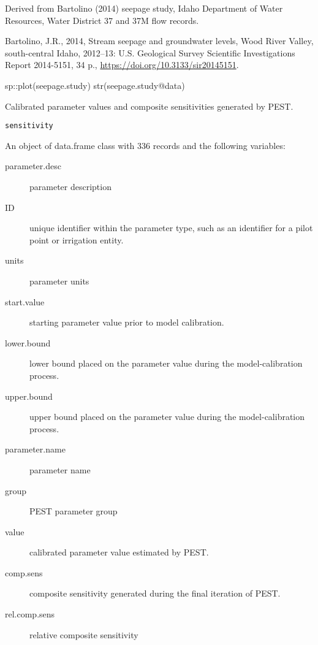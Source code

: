 \documentclass[a4paper]{book}
\begin{document}
%
\begin{Source}\relax
Derived from Bartolino (2014) seepage study,
Idaho Department of Water Resources, Water District 37 and 37M flow records.
\end{Source}
%
\begin{References}\relax
Bartolino, J.R., 2014, Stream seepage and groundwater levels, Wood River Valley,
south-central Idaho, 2012--13: U.S. Geological Survey Scientific Investigations Report 2014-5151,
34 p., \url{https://doi.org/10.3133/sir20145151}.
\end{References}
%
\begin{Examples}
\begin{ExampleCode}
sp::plot(seepage.study)
str(seepage.study@data)

\end{ExampleCode}
\end{Examples}
%
\begin{Description}\relax
Calibrated parameter values and composite sensitivities generated by PEST.
\end{Description}
%
\begin{Usage}
\begin{verbatim}
sensitivity
\end{verbatim}
\end{Usage}
%
\begin{Format}
An object of data.frame class with 336 records and the following variables:
\begin{description}

\item[parameter.desc] parameter description
\item[ID] unique identifier within the parameter type,
such as an identifier for a pilot point or irrigation entity.
\item[units] parameter units
\item[start.value] starting parameter value prior to model calibration.
\item[lower.bound] lower bound placed on the parameter value
during the model-calibration process.
\item[upper.bound] upper bound placed on the parameter value
during the model-calibration process.
\item[parameter.name]  parameter name
\item[group] PEST parameter group
\item[value] calibrated parameter value estimated by PEST.
\item[comp.sens] composite sensitivity generated during the final iteration of PEST.
\item[rel.comp.sens] relative composite sensitivity

\end{description}
\end{Format}
\end{document}
